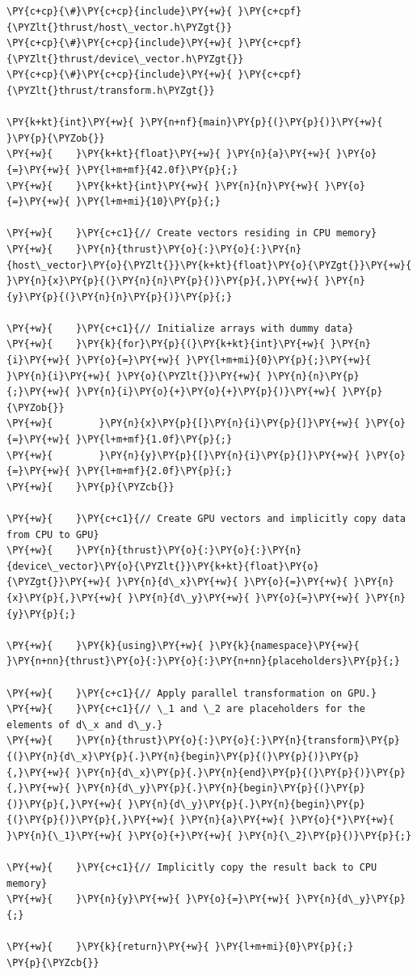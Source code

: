 \begin{Verbatim}[label=\makebox{\url{https://github.com/lucabaldini/cmepda/tree/master/slides/latex/snippets/thrust_saxpy.cu}},commandchars=\\\{\}]
\PY{c+cp}{\#}\PY{c+cp}{include}\PY{+w}{ }\PY{c+cpf}{\PYZlt{}thrust/host\_vector.h\PYZgt{}}
\PY{c+cp}{\#}\PY{c+cp}{include}\PY{+w}{ }\PY{c+cpf}{\PYZlt{}thrust/device\_vector.h\PYZgt{}}
\PY{c+cp}{\#}\PY{c+cp}{include}\PY{+w}{ }\PY{c+cpf}{\PYZlt{}thrust/transform.h\PYZgt{}}

\PY{k+kt}{int}\PY{+w}{ }\PY{n+nf}{main}\PY{p}{(}\PY{p}{)}\PY{+w}{ }\PY{p}{\PYZob{}}
\PY{+w}{    }\PY{k+kt}{float}\PY{+w}{ }\PY{n}{a}\PY{+w}{ }\PY{o}{=}\PY{+w}{ }\PY{l+m+mf}{42.0f}\PY{p}{;}
\PY{+w}{    }\PY{k+kt}{int}\PY{+w}{ }\PY{n}{n}\PY{+w}{ }\PY{o}{=}\PY{+w}{ }\PY{l+m+mi}{10}\PY{p}{;}

\PY{+w}{    }\PY{c+c1}{// Create vectors residing in CPU memory}
\PY{+w}{    }\PY{n}{thrust}\PY{o}{:}\PY{o}{:}\PY{n}{host\_vector}\PY{o}{\PYZlt{}}\PY{k+kt}{float}\PY{o}{\PYZgt{}}\PY{+w}{ }\PY{n}{x}\PY{p}{(}\PY{n}{n}\PY{p}{)}\PY{p}{,}\PY{+w}{ }\PY{n}{y}\PY{p}{(}\PY{n}{n}\PY{p}{)}\PY{p}{;}

\PY{+w}{    }\PY{c+c1}{// Initialize arrays with dummy data}
\PY{+w}{    }\PY{k}{for}\PY{p}{(}\PY{k+kt}{int}\PY{+w}{ }\PY{n}{i}\PY{+w}{ }\PY{o}{=}\PY{+w}{ }\PY{l+m+mi}{0}\PY{p}{;}\PY{+w}{ }\PY{n}{i}\PY{+w}{ }\PY{o}{\PYZlt{}}\PY{+w}{ }\PY{n}{n}\PY{p}{;}\PY{+w}{ }\PY{n}{i}\PY{o}{+}\PY{o}{+}\PY{p}{)}\PY{+w}{ }\PY{p}{\PYZob{}}
\PY{+w}{        }\PY{n}{x}\PY{p}{[}\PY{n}{i}\PY{p}{]}\PY{+w}{ }\PY{o}{=}\PY{+w}{ }\PY{l+m+mf}{1.0f}\PY{p}{;}
\PY{+w}{        }\PY{n}{y}\PY{p}{[}\PY{n}{i}\PY{p}{]}\PY{+w}{ }\PY{o}{=}\PY{+w}{ }\PY{l+m+mf}{2.0f}\PY{p}{;}
\PY{+w}{    }\PY{p}{\PYZcb{}}

\PY{+w}{    }\PY{c+c1}{// Create GPU vectors and implicitly copy data from CPU to GPU}
\PY{+w}{    }\PY{n}{thrust}\PY{o}{:}\PY{o}{:}\PY{n}{device\_vector}\PY{o}{\PYZlt{}}\PY{k+kt}{float}\PY{o}{\PYZgt{}}\PY{+w}{ }\PY{n}{d\_x}\PY{+w}{ }\PY{o}{=}\PY{+w}{ }\PY{n}{x}\PY{p}{,}\PY{+w}{ }\PY{n}{d\_y}\PY{+w}{ }\PY{o}{=}\PY{+w}{ }\PY{n}{y}\PY{p}{;}

\PY{+w}{    }\PY{k}{using}\PY{+w}{ }\PY{k}{namespace}\PY{+w}{ }\PY{n+nn}{thrust}\PY{o}{:}\PY{o}{:}\PY{n+nn}{placeholders}\PY{p}{;}

\PY{+w}{    }\PY{c+c1}{// Apply parallel transformation on GPU.}
\PY{+w}{    }\PY{c+c1}{// \_1 and \_2 are placeholders for the elements of d\_x and d\_y.}
\PY{+w}{    }\PY{n}{thrust}\PY{o}{:}\PY{o}{:}\PY{n}{transform}\PY{p}{(}\PY{n}{d\_x}\PY{p}{.}\PY{n}{begin}\PY{p}{(}\PY{p}{)}\PY{p}{,}\PY{+w}{ }\PY{n}{d\_x}\PY{p}{.}\PY{n}{end}\PY{p}{(}\PY{p}{)}\PY{p}{,}\PY{+w}{ }\PY{n}{d\_y}\PY{p}{.}\PY{n}{begin}\PY{p}{(}\PY{p}{)}\PY{p}{,}\PY{+w}{ }\PY{n}{d\_y}\PY{p}{.}\PY{n}{begin}\PY{p}{(}\PY{p}{)}\PY{p}{,}\PY{+w}{ }\PY{n}{a}\PY{+w}{ }\PY{o}{*}\PY{+w}{ }\PY{n}{\_1}\PY{+w}{ }\PY{o}{+}\PY{+w}{ }\PY{n}{\_2}\PY{p}{)}\PY{p}{;}

\PY{+w}{    }\PY{c+c1}{// Implicitly copy the result back to CPU memory}
\PY{+w}{    }\PY{n}{y}\PY{+w}{ }\PY{o}{=}\PY{+w}{ }\PY{n}{d\_y}\PY{p}{;}

\PY{+w}{    }\PY{k}{return}\PY{+w}{ }\PY{l+m+mi}{0}\PY{p}{;}
\PY{p}{\PYZcb{}}
\end{Verbatim}